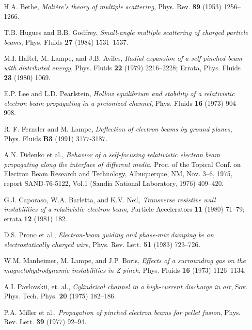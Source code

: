 \documentclass [12pt,a4paper,     ]{report} %
\begin{document}
\begin{enumerate}
 H.A. Bethe, \emph{Moli\`ere's theory of multiple scattering}, Phys. Rev. {\bf 89} (1953) 1256--1266.

 T.B. Hugues and B.B. Godfrey, \emph{Small-angle multiple scattering of charged particle beams}, Phys. Fluids {\bf 27} (1984) 1531--1537.

 M.I. Haftel, M. Lampe, and J.B. Aviles, \emph{Radial expansion of a self-pinched beam with distributed energy}, Phys. Fluids {\bf 22} (1979) 2216--2228; Errata, Phys. Fluids {\bf 23} (1980) 1069. %

 E.P. Lee and L.D. Pearlstein, \emph{Hollow equilibrium and stability of a relativistic electron beam propagating in a preionized channel}, Phys. Fluids {\bf 16} (1973) 904--908.  %




 R. F. Fernsler and M. Lampe, \emph{Deflection of electron beams by ground planes}, Phys. Fluids {\bf B3} (1991) 3177-3187.

 A.N. Didenko et al., \emph{Behavior of a self-focusing relativistic electron beam propagating along the interface of different media},  Proc. of the Topical Conf. on Electron Beam Research and Technology, Albuquerque, NM, Nov. 3--6, 1975, report SAND-76-5122, Vol.1 (Sandia National Laboratory, 1976) 409--420.

 G.J. Caporaso, W.A. Barletta, and K.V. Neil, \emph{Transverse resistive wall instabilities of a relativistic electron beam}, Particle Accelerators {\bf 11} (1980) 71--79; errata {\bf 12} (1981) 182.

 D.S. Prono et al., \emph{Electron-beam guiding and phase-mix damping be an electrostatically charged wire}, Phys. Rev. Lett. {\bf 51} (1983)   723--726.

  W.M. Manheimer, M. Lampe, and J.P. Boris, \emph{Effects of a surrounding gas on the magnetohydrodynamic instabilities in Z pinch}, Phys. Fluids {\bf 16} (1973) 1126--1134.

 A.I. Pavlovskii, et. al., \emph{Cylindrical channel in a high-current discharge in air}, Sov. Phys. Tech. Phys. {\bf 20} (1975) 182--186.

 P.A. Miller et al., \emph{Propagation of pinched electron beams for pellet fusion}, Phys. Rev. Lett. {\bf 39} (1977) 92--94.


\end{enumerate}
\end{document}
